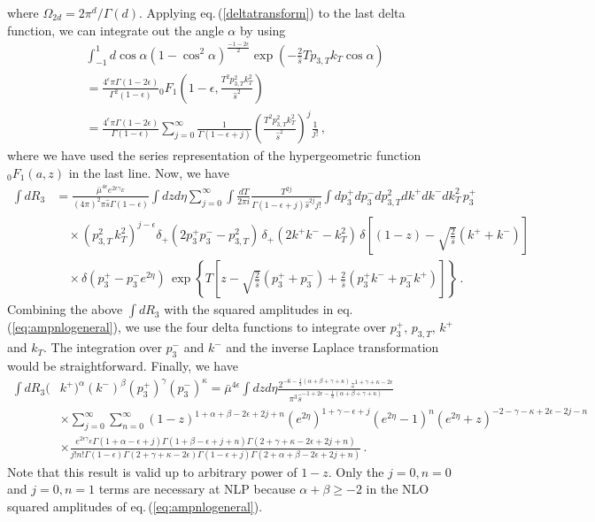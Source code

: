 \documentclass[11pt]{article}
\newcommand{\eps}{\epsilon}
\newcommand\eqn[1]     {eq.\,(\ref{#1})}
\begin{document}
where $\Omega_{2d}=2\pi^{d}/\Gamma(d)$. Applying \eqn{deltatransform} to the last delta function, we can integrate out the angle $\alpha$ by using
\begin{align}\label{eq:integrateangle}
&\int_{-1}^1d\cos\alpha \left(1-\cos^2\alpha\right)^{\frac{-1-2\epsilon}{2}} \exp\left(-\frac{2}{\hat{s}}Tp_{3,T}k_T\cos\alpha\right) \nonumber \\
&=\frac{4^\epsilon\pi\Gamma(1-2\epsilon)}{\Gamma^2(1-\epsilon)}{}_0F_1\left(1-\epsilon,\frac{T^2p^2_{3,T}k^2_T}{\hat{s}^2}\right) \nonumber \\
&=\frac{4^\epsilon\pi\Gamma(1-2\epsilon)}{\Gamma(1-\epsilon)}\sum_{j=0}^{\infty}\frac{1}{\Gamma(1-\epsilon+j)}\left(\frac{T^2p^2_{3,T}k^2_T}{\hat{s}^2}\right)^j\frac{1}{j!}\,,
\end{align}
where we have used the series representation of the hypergeometric function ${}_0F_1\left(a,z\right)$ in the last line. Now, we have
\begin{align}
    \int dR_3 &= \frac{\bar\mu^{4\epsilon}e^{2\eps \gamma_E}}{(4\pi)^2\pi\hat{s}\Gamma(1-\epsilon)}\int dz d\eta\sum_{j=0}^{\infty}\int\frac{dT}{2\pi i}\frac{T^{2j}}{\Gamma(1-\epsilon+j)\hat{s}^{2j}j!}\int dp_3^+dp_3^-dp^2_{3,T}dk^+dk^-dk^2_T\, p_3^+\nonumber \\
    &\quad\times \left(p^2_{3,T} \, k^2_T\right)^{j-\epsilon}\delta_+\left(2p_3^+p_3^--p_{3,T}^2\right) \, \delta_+\left(2k^+k^--k_T^2\right) \, \delta\left[(1-z)-\sqrt{\frac{2}{\hat{s}}}(k^++k^-)\right] \nonumber \\
    &\quad\times \delta\left(p_3^+-p_3^-e^{2\eta}\right) \, \exp\left\{T\left[z-\sqrt{\frac{2}{\hat{s}}}(p_3^++p_3^-)+\frac{2}{\hat{s}}(p_3^+k^-+p_3^-k^+)\right]\right\} \,.
\end{align}
Combining the above $\int dR_3$ with the squared amplitudes in \eqn{eq:ampnlogeneral}, we use the four delta functions to integrate over $p_{3}^+,\,p_{3,T},\,k^+$ and $k_T$. The integration over $p_{3}^-$ and $k^-$ and the inverse Laplace transformation would be straightforward. Finally, we have
%
\begin{align}\label{eq:phaseintnlo}
    \int dR_3(&k^+)^{\alpha}(k^-)^{\beta}(p_3^+)^{\gamma}(p_3^-)^{\kappa} = \bar\mu^{4\epsilon}\int dz d\eta\frac{2^{-6-\frac{1}{2}(\alpha+\beta+\gamma+\kappa)}z^{1+\gamma+\kappa-2\epsilon}}{\pi^{3}\hat{s}^{-1+2\epsilon-\frac{1}{2}(\alpha+\beta+\gamma+\kappa)}} \nonumber \\
    &\times\sum_{j=0}^{\infty}\sum_{n=0}^{\infty}(1-z)^{1+\alpha+\beta-2\epsilon+2j+n}(e^{2\eta})^{1+\gamma-\epsilon+j}(e^{2\eta}-1)^{n}(e^{2\eta}+z)^{-2-\gamma-\kappa+2\epsilon-2j-n}\nonumber \\
    &\times \frac{e^{2\eps\gamma_E}\Gamma(1+\alpha-\epsilon+j)\Gamma(1+\beta-\epsilon+j+n)\Gamma(2+\gamma+\kappa-2\epsilon+2j+n)}{j!n!\Gamma(1-\epsilon)\Gamma(2+\gamma+\kappa-2\epsilon)\Gamma(1-\epsilon+j)\Gamma(2+\alpha+\beta-2\epsilon+2j+n)} \,.
\end{align}
%
Note that this result is valid up to arbitrary power of $1-z$. Only the $j=0, n=0$ and $j=0,n=1$ terms are necessary at NLP because $\alpha+\beta\geq-2$ in the NLO squared amplitudes of \eqn{eq:ampnlogeneral}.
\end{document}
